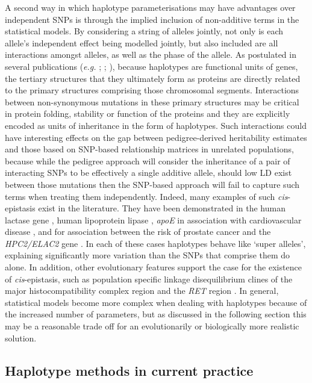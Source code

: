 A second way in which haplotype parameterisations may have advantages over independent SNPs is through the implied inclusion of non-additive terms in the statistical models. By considering a string of alleles jointly, not only is each allele's independent effect being modelled jointly, but also included are all interactions amongst alleles, as well as the phase of the allele. As postulated in several publications (\emph{e.g.} \citealp{Haig2011}; \citealp{Schaid2004}; \citealp{Clark2004}), because haplotypes are functional units of genes, the tertiary structures that they ultimately form as proteins are directly related to the primary structures comprising those chromosomal segments. Interactions between non-synonymous mutations in these primary structures may be critical in protein folding, stability or function of the proteins and they are explicitly encoded as units of inheritance in the form of haplotypes. Such interactions could have interesting effects on the gap between pedigree-derived heritability estimates and those based on SNP-based relationship matrices in unrelated populations, because while the pedigree approach will consider the inheritance of a pair of interacting SNPs to be effectively a single additive allele, should low LD exist between those mutations then the SNP-based approach will fail to capture such terms when treating them independently. Indeed, many examples of such \emph{cis}-epistasis exist in the literature. They have been demonstrated in the human lactase gene \citep{Hollox2001}, human lipoprotein lipase \citep{Clark1998}, \emph{apoE} in association with cardiovascular disease \citep{Fullerton2000}, and for association between the risk of prostate cancer and the \emph{HPC2/ELAC2} gene \citep{Tavtigian2001}. In each of these cases haplotypes behave like `super alleles', explaining significantly more variation than the SNPs that comprise them do alone. In addition, other evolutionary features support the case for the existence of \emph{cis}-epistasis, such as population specific linkage disequilibrium clines of the major histocompatibility complex region \citep{Cavalli-Sforza1994} and the \emph{RET} region \citep{Chattopadhyay2003}. In general, statistical models become more complex when dealing with haplotypes because of the increased number of parameters, but as discussed in the following section this may be a reasonable trade off for an evolutionarily or biologically more realistic solution.


\subsection{Haplotype methods in current practice}

